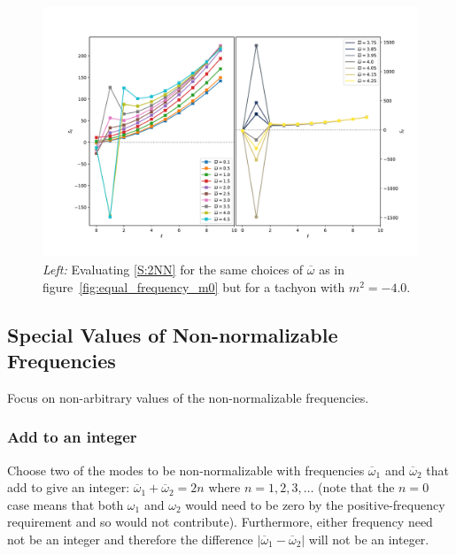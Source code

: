\documentclass[letterpaper,11pt]{article}
\newcommand{\oone}{\overline{\omega}_1}
\newcommand{\otwo}{\overline{\omega}_2}
\newcommand{\ob}{\overline{\omega}}
\begin{document}
\begin{figure}[h]
\centering
\includegraphics[width=\textwidth]{./figures/NN_equalfreq_sourceterms_m-4_0+zoom}
\caption{{\it Left:} Evaluating \eqref{S:2NN} for the same choices of $\ob$ as in figure~\ref{fig:equal_frequency_m0} but for a tachyon with $m^2 = -4.0$.}
\label{fig:equal_frequency_m-4_0}
\end{figure}


\subsection{Special Values of Non-normalizable Frequencies}

Focus on non-arbitrary values of the non-normalizable frequencies.

\subsubsection{Add to an integer}
\label{ssec: add to integer}

Choose two of the modes to be non-normalizable with frequencies $\oone$ and $\otwo$ that add to give an integer: $\oone+ \otwo = 2n$ where $n = 1, 2, 3, \ldots$ (note that the $n = 0$ case means that both $\omega_1$ and $\omega_2$ would need to be zero by the positive-frequency requirement and so would not contribute). Furthermore, either frequency need not be an integer and therefore the difference $|\oone - \otwo|$ will not be an integer. 
\end{document}
